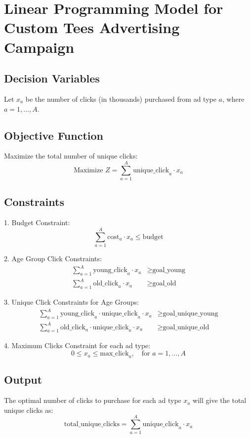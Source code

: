 \documentclass{article}
\begin{document}
\section*{Linear Programming Model for Custom Tees Advertising Campaign}

\subsection*{Decision Variables}

Let \( x_a \) be the number of clicks (in thousands) purchased from ad type \( a \), where \( a = 1, \ldots, A \).

\subsection*{Objective Function}

Maximize the total number of unique clicks:
\[
\text{Maximize } Z = \sum_{a=1}^{A} \text{unique\_click}_a \cdot x_a
\]

\subsection*{Constraints}

1. Budget Constraint:
\[
\sum_{a=1}^{A} \text{cost}_a \cdot x_a \leq \text{budget}
\]

2. Age Group Click Constraints:
\begin{align*}
\sum_{a=1}^{A} \text{young\_click}_a \cdot x_a &\geq \text{goal\_young} \\
\sum_{a=1}^{A} \text{old\_click}_a \cdot x_a &\geq \text{goal\_old}
\end{align*}

3. Unique Click Constraints for Age Groups:
\begin{align*}
\sum_{a=1}^{A} \text{young\_click}_a \cdot \text{unique\_click}_a \cdot x_a &\geq \text{goal\_unique\_young} \\
\sum_{a=1}^{A} \text{old\_click}_a \cdot \text{unique\_click}_a \cdot x_a &\geq \text{goal\_unique\_old}
\end{align*}

4. Maximum Clicks Constraint for each ad type:
\[
0 \leq x_a \leq \text{max\_click}_a, \quad \text{for } a = 1, \ldots, A
\]

\subsection*{Output}

The optimal number of clicks to purchase for each ad type \( x_a \) will give the total unique clicks as:
\[
\text{total\_unique\_clicks} = \sum_{a=1}^{A} \text{unique\_click}_a \cdot x_a
\]
\end{document}
